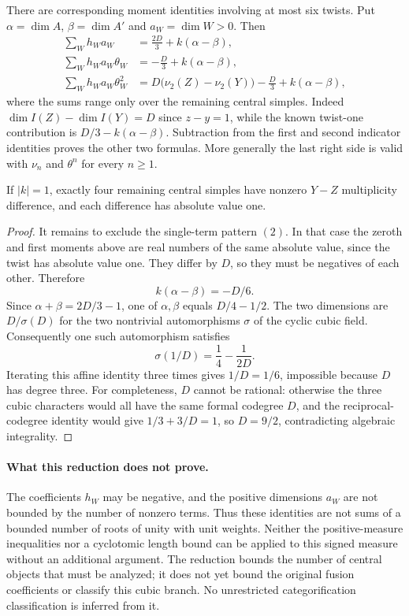 There are corresponding moment identities involving at most six twists.
Put $\alpha=\dim A$, $\beta=\dim A'$ and $a_W=\dim W>0$. Then
\begin{align*}
 \sum_W h_Wa_W&=\frac{2D}{3}+k(\alpha-\beta),\\
 \sum_W h_Wa_W\theta_W&=-\frac D3+k(\alpha-\beta),\\
 \sum_W h_Wa_W\theta_W^2
 &=D\bigl(\nu_2(Z)-\nu_2(Y)\bigr)-\frac D3+k(\alpha-\beta),
\end{align*}
where the sums range only over the remaining central simples.
Indeed $\dim I(Z)-\dim I(Y)=D$ since $z-y=1$, while the known
twist-one contribution is $D/3-k(\alpha-\beta)$. Subtraction from
the first and second indicator identities proves the other two formulas.
More generally the last right side is valid with $\nu_n$ and $\theta^n$
for every $n\geq1$.

\begin{corollary}
If $|k|=1$, exactly four remaining central simples have nonzero
$Y-Z$ multiplicity difference, and each difference has absolute value one.
\end{corollary}
\begin{proof}
It remains to exclude the single-term pattern $(2)$. In that case the
zeroth and first moments above are real numbers of the same absolute
value, since the twist has absolute value one. They differ by $D$, so
they must be negatives of each other. Therefore
\[
 k(\alpha-\beta)=-D/6.
\]
Since $\alpha+\beta=2D/3-1$, one of $\alpha,\beta$ equals
$D/4-1/2$. The two dimensions are $D/\sigma(D)$ for the two nontrivial
automorphisms $\sigma$ of the cyclic cubic field. Consequently one such
automorphism satisfies
\[
 \sigma(1/D)=\frac14-\frac1{2D}.
\]
Iterating this affine identity three times gives $1/D=1/6$, impossible
because $D$ has degree three. For completeness, $D$ cannot be rational:
otherwise the three cubic characters would all have the same formal
codegree $D$, and the reciprocal-codegree identity would give
$1/3+3/D=1$, so $D=9/2$, contradicting algebraic integrality.
\end{proof}

\paragraph{What this reduction does not prove.}
The coefficients $h_W$ may be negative, and the positive dimensions
$a_W$ are not bounded by the number of nonzero terms. Thus these identities
are not sums of a bounded number of roots of unity with unit weights.
Neither the positive-measure inequalities nor a cyclotomic length bound
can be applied to this signed measure without an additional argument.
The reduction bounds the number of central objects that must be analyzed;
it does not yet bound the original fusion coefficients or classify this
cubic branch. No unrestricted categorification classification is inferred
from it.
